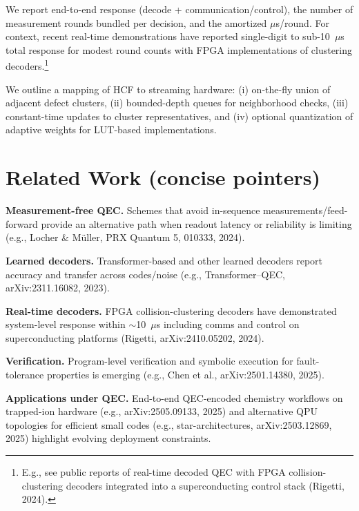 \documentclass[conference]{IEEEtran}
\begin{document}
    We report end-to-end response (decode + communication/control), the number of measurement rounds bundled per 
decision, and the amortized $\mu$s/round. For context, recent real-time demonstrations have reported single-digit to 
sub-10~$\mu$s total response for modest round counts with FPGA implementations of clustering decoders.\footnote{E.g., 
see public reports of real-time decoded QEC with FPGA collision-clustering decoders integrated into a superconducting 
control stack (Rigetti, 2024).}

    We outline a mapping of HCF to streaming hardware: (i) on-the-fly union of adjacent defect clusters, (ii) bounded-depth
 queues for neighborhood checks, (iii) constant-time updates to cluster representatives, and (iv) optional quantization of 
adaptive weights for LUT-based implementations.

    \clearpage
    \section{Related Work (concise pointers)}
    \label{sec:related}
    \noindent \textbf{Measurement-free QEC.} Schemes that avoid in-sequence measurements/feed-forward provide an 
alternative path when readout latency or reliability is limiting (e.g., Locher \& Müller, PRX Quantum 5, 010333, 2024).

    \noindent \textbf{Learned decoders.} Transformer-based and other learned decoders report accuracy and transfer across 
codes/noise (e.g., Transformer--QEC, arXiv:2311.16082, 2023).

    \noindent \textbf{Real-time decoders.} FPGA collision-clustering decoders have demonstrated system-level response 
within $\sim$10~$\mu$s including comms and control on superconducting platforms (Rigetti, arXiv:2410.05202, 2024).

    \noindent \textbf{Verification.} Program-level verification and symbolic execution for fault-tolerance properties is 
emerging (e.g., Chen et al., arXiv:2501.14380, 2025).

    \noindent \textbf{Applications under QEC.} End-to-end QEC-encoded chemistry workflows on trapped-ion hardware (e.g., 
arXiv:2505.09133, 2025) and alternative QPU topologies for efficient small codes (e.g., star-architectures, 
arXiv:2503.12869, 2025) highlight evolving deployment constraints.

    \clearpage
\end{document}
